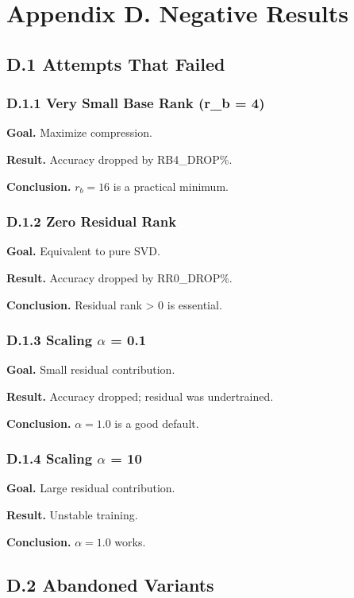 \section{Appendix D. Negative Results}

\subsection{D.1 Attempts That Failed}

\subsubsection{D.1.1 Very Small Base Rank (r\_b = 4)}

\textbf{Goal.} Maximize compression.

\textbf{Result.} Accuracy dropped by {{RB4\_DROP}}\%.

\textbf{Conclusion.} $r_b = 16$ is a practical minimum.

\subsubsection{D.1.2 Zero Residual Rank}

\textbf{Goal.} Equivalent to pure SVD.

\textbf{Result.} Accuracy dropped by {{RR0\_DROP}}\%.

\textbf{Conclusion.} Residual rank > 0 is essential.

\subsubsection{D.1.3 Scaling $\alpha$ = 0.1}

\textbf{Goal.} Small residual contribution.

\textbf{Result.} Accuracy dropped; residual was undertrained.

\textbf{Conclusion.} $\alpha = 1.0$ is a good default.

\subsubsection{D.1.4 Scaling $\alpha$ = 10}

\textbf{Goal.} Large residual contribution.

\textbf{Result.} Unstable training.

\textbf{Conclusion.} $\alpha = 1.0$ works.

\subsection{D.2 Abandoned Variants}

